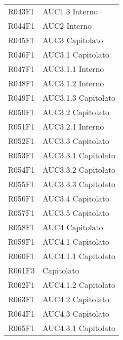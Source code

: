 \documentclass[../analisi-dei-requisiti.tex]{subfiles}
\begin{document}
\begin{center}
\begin{longtable}[H]{ p{3cm} | p{4cm} }
  R043F1                               & AUC1.3 Interno                \\
  R044F1                               & AUC2 Interno                  \\
  R045F1                               & AUC3 Capitolato               \\
  R046F1                               & AUC3.1 Capitolato             \\
  R047F1                               & AUC3.1.1 Interno              \\
  R048F1                               & AUC3.1.2 Interno              \\
  R049F1                               & AUC3.1.3 Capitolato           \\
  R050F1                               & AUC3.2 Capitolato             \\
  R051F1                               & AUC3.2.1 Interno              \\
  R052F1                               & AUC3.3 Capitolato             \\
  R053F1                               & AUC3.3.1 Capitolato           \\
  R054F1                               & AUC3.3.2 Capitolato           \\
  R055F1                               & AUC3.3.3 Capitolato           \\
  R056F1                               & AUC3.4 Capitolato             \\
  R057F1                               & AUC3.5 Capitolato             \\
  R058F1                               & AUC4 Capitolato               \\
  R059F1                               & AUC4.1 Capitolato             \\
  R060F1                               & AUC4.1.1 Capitolato           \\
  R061F3                               & Capitolato                    \\
  R062F1                               & AUC4.1.2 Capitolato           \\
  R063F1                               & AUC4.2 Capitolato             \\
  R064F1                               & AUC4.3 Capitolato             \\
  R065F1                               & AUC4.3.1 Capitolato           \\

\end{longtable}
\end{center}
\end{document}
